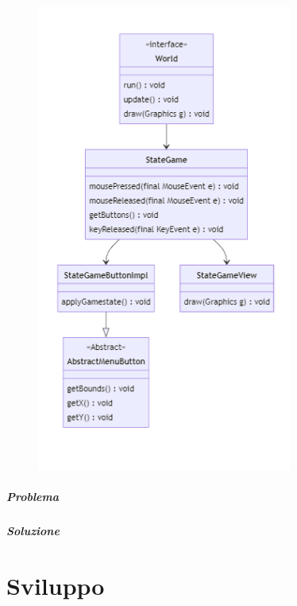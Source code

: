 \documentclass[a4paper,12pt]{report}
\begin{document}
\begin{figure}[H]
    \centering{}
    \includegraphics[width=0.75\textwidth]{img/UMLSchermatePWL.png}
    \caption{}
\end{figure}

\paragraph{Problema}

\paragraph{Soluzione}

\chapter{Sviluppo}
\end{document}
